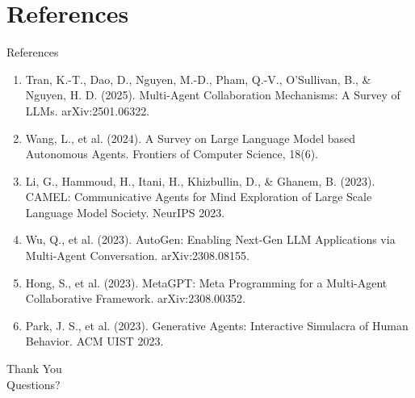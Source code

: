 \documentclass[10pt]{beamer}
\begin{document}
\section{References}
\begin{frame}[allowframebreaks]{References}
  \footnotesize
  \begin{enumerate}
    \item Tran, K.-T., Dao, D., Nguyen, M.-D., Pham, Q.-V., O'Sullivan, B., \& Nguyen, H. D. (2025). Multi-Agent Collaboration Mechanisms: A Survey of LLMs. arXiv:2501.06322.
    \item Wang, L., et al. (2024). A Survey on Large Language Model based Autonomous Agents. Frontiers of Computer Science, 18(6).
    \item Li, G., Hammoud, H., Itani, H., Khizbullin, D., \& Ghanem, B. (2023). CAMEL: Communicative Agents for Mind Exploration of Large Scale Language Model Society. NeurIPS 2023.
    \item Wu, Q., et al. (2023). AutoGen: Enabling Next-Gen LLM Applications via Multi-Agent Conversation. arXiv:2308.08155.
    \item Hong, S., et al. (2023). MetaGPT: Meta Programming for a Multi-Agent Collaborative Framework. arXiv:2308.00352.
    \item Park, J. S., et al. (2023). Generative Agents: Interactive Simulacra of Human Behavior. ACM UIST 2023.
  \end{enumerate}
\end{frame}
\begin{frame}[plain]
  \begin{center}
    {\Huge Thank You}\\[1em]
    {\large Questions?}
  \end{center}
\end{frame}
\end{document}

